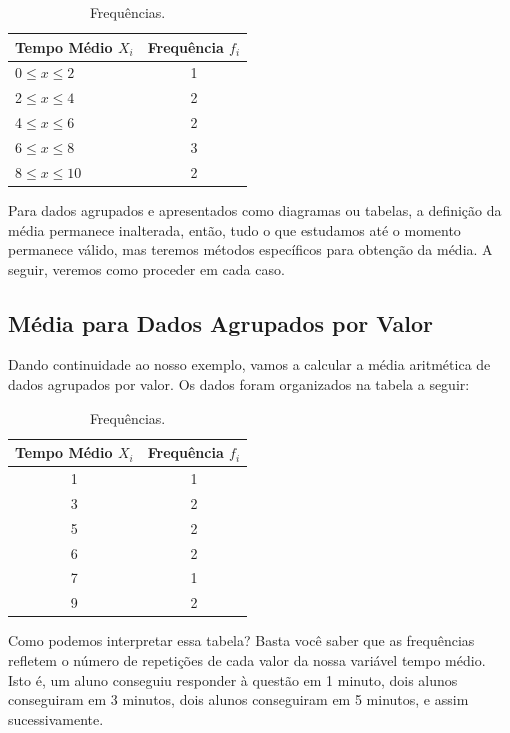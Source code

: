 \begin{table}[H]
    \centering
\begin{tabular}{lc}
\toprule
\shortstack{Tempo \\Médio \(X_i\)} &Frequência \(f_i\)\\
\midrule
0\(\leq x \le 2\)      &1\\
2\(\leq x \le 4\)      &2\\
4\(\leq x \le 6\)      &2\\
6\(\leq x \le 8\)      &3\\
8\(\leq x \le 10\)     &2\\
\bottomrule
\end{tabular}
\caption{Frequências.}
\end{table}

Para dados agrupados e apresentados como diagramas ou tabelas, a definição da média permanece inalterada, então, tudo o que estudamos até o momento permanece válido, mas teremos métodos específicos para obtenção da média. A seguir, veremos como proceder em cada caso.

\subsection{Média para Dados Agrupados por Valor}

Dando continuidade ao nosso exemplo, vamos a calcular a média aritmética de dados agrupados por valor. Os dados foram organizados na tabela a seguir:

\begin{table}[H]
    \centering
\begin{tabular}{cc}
\toprule
\shortstack{Tempo \\Médio \(X_i\)} &Frequência \(f_i\)\\
\midrule
1      &1\\
3      &2\\
5      &2\\
6      &2\\
7      &1\\
9      &2\\
\bottomrule
\end{tabular}
\caption{Frequências.}
\end{table}

Como podemos interpretar essa tabela? Basta você saber que as frequências refletem o número de repetições de cada valor da nossa variável tempo médio. Isto é, um aluno conseguiu responder à questão em 1 minuto, dois alunos conseguiram em 3 minutos, dois alunos conseguiram em 5 minutos, e assim
sucessivamente.

